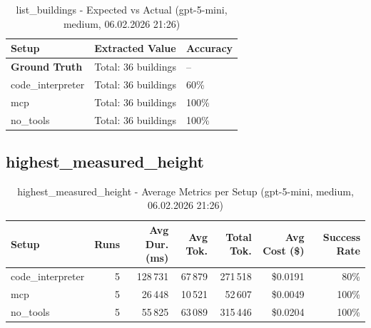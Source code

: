 \documentclass[a4paper,11pt]{article}
\begin{document}
\begin{table}[H]
\centering
\scriptsize
\caption{list\_buildings - Expected vs Actual (gpt-5-mini, medium, 06.02.2026 21:26)}
\begin{tabular}{l l l}
\toprule
Setup & Extracted Value & Accuracy \\
\midrule
\textbf{Ground Truth} & Total: 36 buildings & -- \\
\midrule
code\_interpreter & Total: 36 buildings & 60\% \\
mcp & Total: 36 buildings & 100\% \\
no\_tools & Total: 36 buildings & 100\% \\
\bottomrule
\end{tabular}
\end{table}

\clearpage

\subsection{highest\_measured\_height}

\begin{table}[H]
\centering
\scriptsize
\caption{highest\_measured\_height - Average Metrics per Setup (gpt-5-mini, medium, 06.02.2026 21:26)}
\label{tab:combined\_highest\_measured\_height\_metrics\_20260206}
\begin{tabular}{l r r r r r r}
\toprule
Setup & Runs & Avg Dur. (ms) & Avg Tok. & Total Tok. & Avg Cost (\$) & Success Rate \\
\midrule
code\_interpreter & 5 & 128\,731 & 67\,879 & 271\,518 & \$0.0191 & 80\% \\
mcp & 5 & 26\,448 & 10\,521 & 52\,607 & \$0.0049 & 100\% \\
no\_tools & 5 & 55\,825 & 63\,089 & 315\,446 & \$0.0204 & 100\% \\
\bottomrule
\end{tabular}
\end{table}
\end{document}

